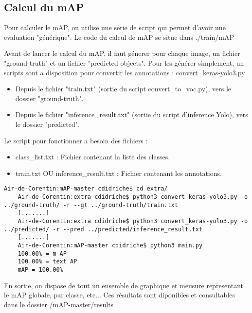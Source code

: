 \subsection{Calcul du mAP}

Pour calculer le mAP, on utilise une série de script qui permet d'avoir une evaluation "générique".
Le code du calcul de mAP se situe dans ./train/mAP

Avant de lancer le calcul du mAP, il faut génerer pour chaque image, un fichier "ground-truth" et un fichier "predicted objects".
Pour les générer simplement, un scripts sont a disposition pour convertir les annotations : convert_keras-yolo3.py
\begin{itemize}
    \item Depuis le fichier "train.txt" (sortie du script convert_to_voc.py), vers le dossier "ground-truth".
    \item Depuis le fichier "inference_result.txt" (sortie du script d'inference Yolo), vers le dossier "predicted".
\end{itemize}

Le script pour fonctionner a besoin des fichiers :
\begin{itemize}
    \item class_list.txt : Fichier contenant la liste des classes.
    \item train.txt OU inference_result.txt : Fichier contenant les annotations.
\end{itemize}

\begin{lstlisting}[style=console]
    Air-de-Corentin:mAP-master cdidriche$ cd extra/
    Air-de-Corentin:extra cdidriche$ python3 convert_keras-yolo3.py -o ../ground-truth/ -r --gt ../ground-truth/train.txt
    [.......]
    Air-de-Corentin:extra cdidriche$ python3 convert_keras-yolo3.py -o ../predicted/ -r --pred ../predicted/inference_result.txt
    [.......]
    Air-de-Corentin:mAP-master cdidriche$ python3 main.py
    100.00% = m AP
    100.00% = text AP
    mAP = 100.00%
\end{lstlisting}

En sortie, on dispose de tout un ensemble de graphique et meusure representant le mAP globale, par classe, etc...
Ces résultats sont diponibles et consultables dans le dossier /mAP-master/results

